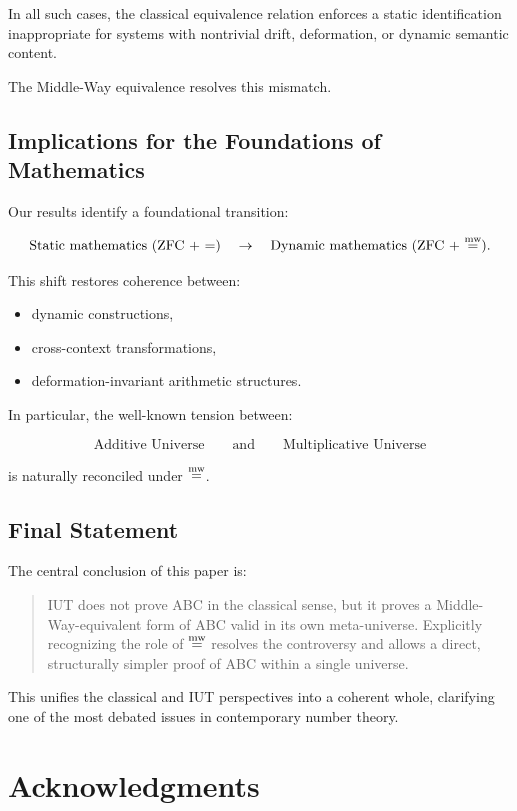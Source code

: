 \documentclass[11pt]{article}
\begin{document}
In all such cases, the classical equivalence relation enforces a static
identification inappropriate for systems with nontrivial drift,
deformation, or dynamic semantic content.

The Middle-Way equivalence resolves this mismatch.

\subsection{Implications for the Foundations of Mathematics}

Our results identify a foundational transition:

\[
\text{Static mathematics (ZFC + =)}
\quad\to\quad
\text{Dynamic mathematics (ZFC + $\mathrel{\overset{\mathrm{mw}}{=}}$)}.
\]

This shift restores coherence between:

\begin{itemize}
\item dynamic constructions,
\item cross-context transformations,
\item deformation-invariant arithmetic structures.
\end{itemize}

In particular, the well-known tension between:

\[
\text{Additive Universe} \qquad
\text{and} \qquad
\text{Multiplicative Universe}
\]

is naturally reconciled under $\mathrel{\overset{\mathrm{mw}}{=}}$.

\subsection{Final Statement}

The central conclusion of this paper is:

\begin{quote}
IUT does not prove ABC in the classical sense,  
but it proves a Middle-Way-equivalent form of ABC valid in its own
meta-universe.  
Explicitly recognizing the role of $\mathrel{\overset{\mathrm{mw}}{=}}$ resolves the controversy  
and allows a direct, structurally simpler proof of ABC within a single
universe.
\end{quote}

This unifies the classical and IUT perspectives into a coherent whole,
clarifying one of the most debated issues in contemporary number theory.

\section*{Acknowledgments}
\end{document}
